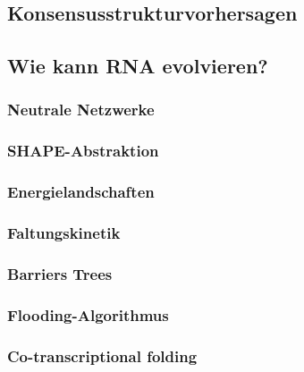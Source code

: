 \documentclass[12pt,a4paper]{article}
\begin{document}
\subsection{Konsensusstrukturvorhersagen}

\subsection{Wie kann RNA evolvieren?}

\subsubsection{Neutrale Netzwerke}

\subsubsection{SHAPE-Abstraktion}

\subsubsection{Energielandschaften}

\subsubsection{Faltungskinetik}

\subsubsection{Barriers Trees}

\subsubsection{Flooding-Algorithmus}

\subsubsection{Co-transcriptional folding}


\end{document}
